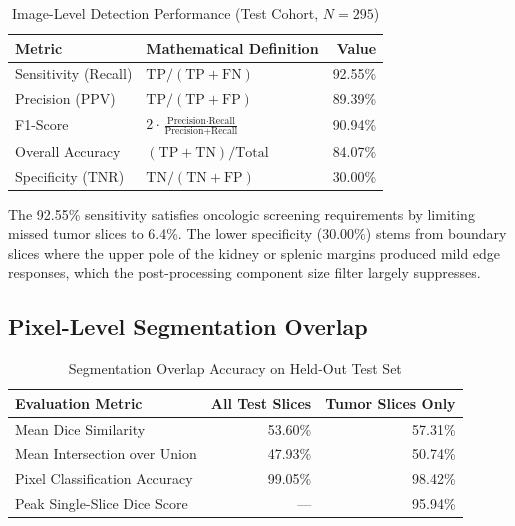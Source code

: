 \documentclass[conference]{IEEEtran}
\begin{document}
\begin{table}[htbp]
\caption{Image-Level Detection Performance (Test Cohort, $N = 295$)}
\begin{center}
\begin{tabular}{llr}
\toprule
\textbf{Metric} & \textbf{Mathematical Definition} & \textbf{Value} \\
\midrule
Sensitivity (Recall) & $\text{TP} / (\text{TP} + \text{FN})$ & 92.55\% \\
Precision (PPV) & $\text{TP} / (\text{TP} + \text{FP})$ & 89.39\% \\
F1-Score & $2 \cdot \frac{\text{Precision} \cdot \text{Recall}}{\text{Precision} + \text{Recall}}$ & 90.94\% \\
Overall Accuracy & $(\text{TP} + \text{TN}) / \text{Total}$ & 84.07\% \\
Specificity (TNR) & $\text{TN} / (\text{TN} + \text{FP})$ & 30.00\% \\
\bottomrule
\end{tabular}
\end{center}
\label{tab:detection}
\end{table}

The 92.55\% sensitivity satisfies oncologic screening requirements by limiting missed tumor slices to 6.4\%. The lower specificity (30.00\%) stems from boundary slices where the upper pole of the kidney or splenic margins produced mild edge responses, which the post-processing component size filter largely suppresses.

\subsection{Pixel-Level Segmentation Overlap}
\begin{table}[htbp]
\caption{Segmentation Overlap Accuracy on Held-Out Test Set}
\begin{center}
\begin{tabular}{lrr}
\toprule
\textbf{Evaluation Metric} & \textbf{All Test Slices} & \textbf{Tumor Slices Only} \\
\midrule
Mean Dice Similarity & 53.60\% & 57.31\% \\
Mean Intersection over Union & 47.93\% & 50.74\% \\
Pixel Classification Accuracy & 99.05\% & 98.42\% \\
Peak Single-Slice Dice Score & --- & 95.94\% \\
\bottomrule
\end{tabular}
\end{center}
\label{tab:segmentation}
\end{table}
\end{document}
